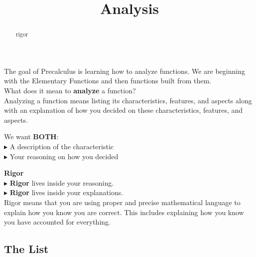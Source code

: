 \documentclass{ximera}
\title{Analysis}
\begin{document}
\begin{abstract}
rigor
\end{abstract}
\maketitle





The goal of Precalculus is learning how to analyze functions.  We are beginning with the Elementary Functions and then functions built from them. \\

What does it mean to \textbf{\textcolor{blue!55!black}{analyze}} a function? \\ 



Analyzing a function means listing its characteristics, features, and aspects along with an explanation of how you decided on these characteristics, features, and aspects.


We want \textbf{BOTH}: \\
\textbf{\textcolor{red!90!darkgray}{$\blacktriangleright$}} A description of the characteristic \\
\textbf{\textcolor{red!90!darkgray}{$\blacktriangleright$}} Your reasoning on how you decided \\



\begin{definition} \textbf{\textcolor{green!50!black}{Rigor}} \\


\textbf{\textcolor{red!90!darkgray}{$\blacktriangleright$}} \textbf{\textcolor{purple!85!blue}{Rigor}} lives inside your reasoning. \\

\textbf{\textcolor{red!90!darkgray}{$\blacktriangleright$}} \textbf{\textcolor{purple!85!blue}{Rigor}} lives inside your explanations. \\



Rigor means that you are using proper and precise mathematical language to explain how you know you are correct. This includes explaining how you know you have accounted for everything.


\end{definition}



\subsection*{The List}
\end{document}
